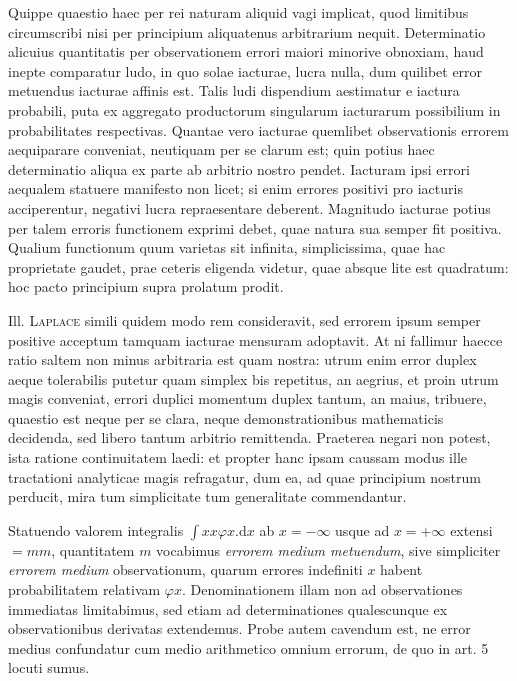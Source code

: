 Quippe quaestio haec per rei naturam aliquid vagi implicat, quod limitibus circumscribi nisi per principium aliquatenus arbitrarium nequit. Determinatio alicuius quantitatis per observationem errori maiori minorive obnoxiam, haud inepte comparatur ludo, in quo solae iacturae, lucra nulla, dum quilibet error metuendus iacturae affinis est. Talis ludi dispendium aestimatur e iactura probabili, puta ex aggregato productorum singularum iacturarum possibilium in probabilitates respectivas. Quantae vero iacturae quemlibet observationis errorem aequiparare conveniat, neutiquam per se clarum est; quin potius haec determinatio aliqua ex parte ab arbitrio nostro pendet. Iacturam ipsi errori aequalem statuere manifesto non licet; si enim errores positivi pro iacturis acciperentur, negativi lucra repraesentare deberent. Magnitudo iacturae potius per talem erroris functionem exprimi debet, quae natura sua semper fit positiva. Qualium functionum quum varietas sit infinita, simplicissima, quae hac proprietate gaudet, prae ceteris eligenda videtur, quae absque lite est quadratum: hoc pacto principium supra prolatum prodit.

Ill. \textsc{Laplace} simili quidem modo rem consideravit, sed errorem ipsum semper positive acceptum tamquam iacturae mensuram adoptavit. At ni fallimur haecce ratio saltem non minus arbitraria est quam nostra: utrum enim error duplex aeque tolerabilis putetur quam simplex bis repetitus, an aegrius, et proin utrum magis conveniat, errori duplici momentum duplex tantum, an maius, tribuere, quaestio est neque per se clara, neque demonstrationibus mathematicis decidenda, sed libero tantum arbitrio remittenda. Praeterea negari non potest, ista ratione continuitatem laedi: et propter hanc ipsam caussam modus ille tractationi analyticae magis refragatur, dum ea, ad quae principium nostrum perducit, mira tum simplicitate tum generalitate commendantur.

Statuendo valorem integralis \(\int xx\varphi x.\mathrm{d}x\) ab \(x=-\infty\) usque ad \(x=+\infty\) extensi \(=mm\), quantitatem \(m\) vocabimus \textit{errorem medium metuendum}, sive simpliciter \textit{errorem medium} observationum, quarum errores indefiniti \(x\) habent probabilitatem relativam \(\varphi x\). Denominationem illam non ad observationes immediatas limitabimus, sed etiam ad determinationes qualescunque ex observationibus derivatas extendemus. Probe autem cavendum est, ne error medius confundatur cum medio arithmetico omnium errorum, de quo in art. 5 locuti sumus.

